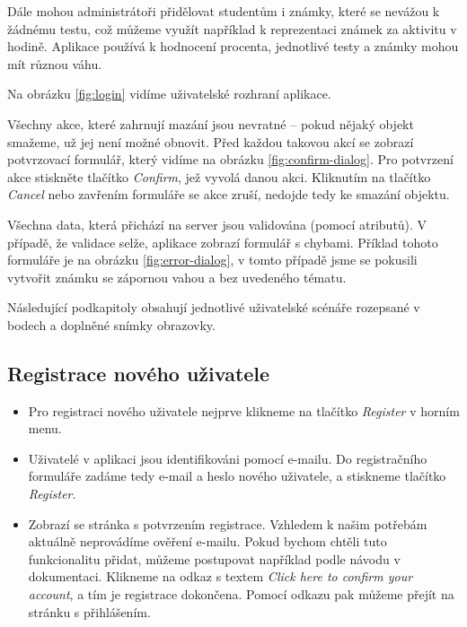 Dále mohou administrátoři přidělovat studentům i známky, které se nevážou k žádnému testu, což můžeme využít například k reprezentaci známek za aktivitu v hodině.
Aplikace používá k hodnocení procenta, jednotlivé testy a známky mohou mít různou váhu. 

Na obrázku \ref{fig:login} vidíme uživatelské rozhraní aplikace. 

Všechny akce, které zahrnují mazání jsou nevratné -- pokud nějaký objekt smažeme, už jej není možné obnovit. Před každou takovou akcí se zobrazí potvrzovací formulář, který vidíme na obrázku \ref{fig:confirm-dialog}. 
Pro potvrzení akce stiskněte tlačítko \textit{Confirm}, jež vyvolá danou akci. Kliknutím na tlačítko \textit{Cancel} nebo zavřením formuláře se akce zruší, nedojde tedy ke smazání objektu.

Všechna data, která přichází na server jsou validována (pomocí atributů). V případě, že validace selže, aplikace zobrazí formulář s chybami. Příklad tohoto formuláře je na obrázku \ref{fig:error-dialog}, v tomto případě jsme se pokusili vytvořit známku se zápornou vahou a bez uvedeného tématu.

\vspace{\baselineskip}

Následující podkapitoly obsahují jednotlivé uživatelské scénáře rozepsané v bodech a doplněné snímky obrazovky.

\subsection{Registrace nového uživatele}

\begin{itemize}
	\item Pro registraci nového uživatele nejprve klikneme na tlačítko \textit{Register} v horním menu.
	\item Uživatelé v aplikaci jsou identifikováni pomocí e-mailu. Do registračního formuláře zadáme tedy e-mail a heslo nového uživatele, a stiskneme tlačítko \textit{Register}.
	\item Zobrazí se stránka s potvrzením registrace. Vzhledem k našim potřebám aktuálně neprovádíme ověření e-mailu. Pokud bychom chtěli tuto funkcionalitu přidat, můžeme postupovat například podle návodu v dokumentaci. \cite{AspNetCoreDocs} Klikneme na odkaz s textem \textit{Click here to confirm your account}, a tím je registrace dokončena. Pomocí odkazu pak můžeme přejít na stránku s přihlášením.
\end{itemize}

